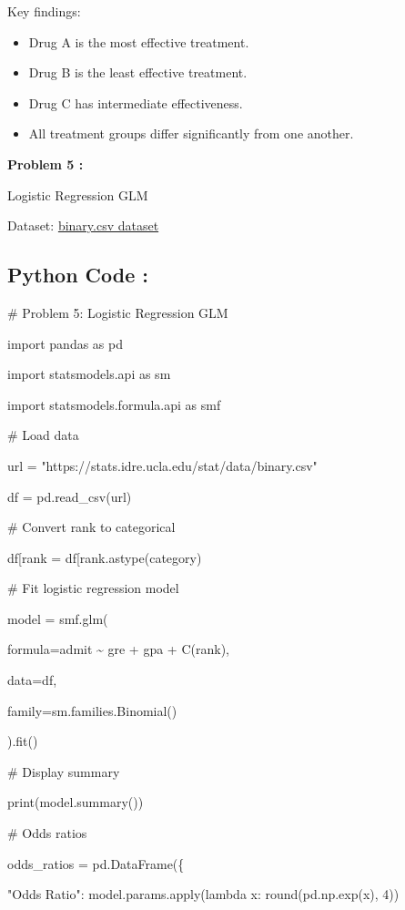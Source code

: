 \documentclass[
]{article}
\begin{document}
Key findings:

\begin{itemize}
\item
  Drug A is the most effective treatment.
\item
  Drug B is the least effective treatment.
\item
  Drug C has intermediate effectiveness.
\item
  All treatment groups differ significantly from one another.
\end{itemize}

\textbf{Problem 5 :}

Logistic Regression GLM

Dataset:
\href{https://stats.idre.ucla.edu/stat/data/binary.csv?utm_source=chatgpt.com}{binary.csv
dataset}

\subsection{\texorpdfstring{\textbf{Python Code
:}}{Python Code :}}\label{python-code-10}

\# Problem 5: Logistic Regression GLM

import pandas as pd

import statsmodels.api as sm

import statsmodels.formula.api as smf

\# Load data

url = "https://stats.idre.ucla.edu/stat/data/binary.csv"

df = pd.read\_csv(url)

\# Convert rank to categorical

df{[}\textquotesingle rank\textquotesingle{]} =
df{[}\textquotesingle rank\textquotesingle{]}.astype(\textquotesingle category\textquotesingle)

\# Fit logistic regression model

model = smf.glm(

formula=\textquotesingle admit \textasciitilde{} gre + gpa +
C(rank)\textquotesingle,

data=df,

family=sm.families.Binomial()

).fit()

\# Display summary

print(model.summary())

\# Odds ratios

odds\_ratios = pd.DataFrame(\{

"Odds Ratio": model.params.apply(lambda x: round(pd.np.exp(x), 4))
\end{document}
